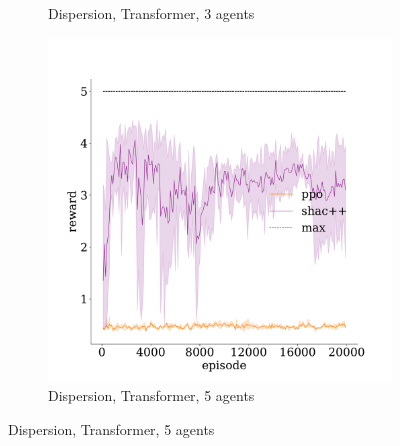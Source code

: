\begin{figure}[!t]
\begin{subfigure}[b]{0.30\textwidth}
        \caption{Dispersion, Transformer, 3 agents}
        \label{fig:dispersion-transformer-3}
    \end{subfigure}
    \begin{subfigure}[b]{0.30\textwidth}
        \includegraphics[width=\textwidth]{figs/dispersion-5-transformer.pdf}
        \caption{Dispersion, Transformer, 5 agents}
        \label{fig:dispersion-transformer-5}
    \end{subfigure}


\end{figure}
